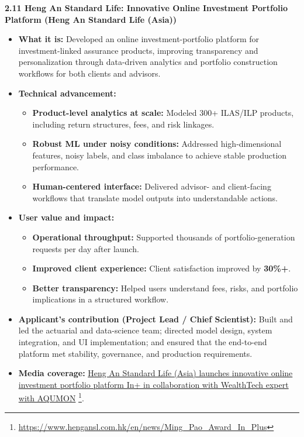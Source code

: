 \documentclass[11pt]{article}
\newcommand{\CVSubsection}[1]{\textbf{#1}\par}
\newenvironment{tightitemize}{%
  \begin{itemize}[leftmargin=*,nosep,topsep=2pt]
}{\end{itemize}}
\begin{document}
\vspace{0.8em}

\CVSubsection{2.11 Heng An Standard Life: Innovative Online Investment Portfolio Platform (Heng An Standard Life (Asia))}

\begin{tightitemize}
  \item \textbf{What it is:} Developed an online investment-portfolio platform for investment-linked assurance products, improving transparency and personalization through data-driven analytics and portfolio construction workflows for both clients and advisors.
  \item \textbf{Technical advancement:}
  \begin{tightitemize}
    \item \textbf{Product-level analytics at scale:} Modeled 300+ ILAS/ILP products, including return structures, fees, and risk linkages.
    \item \textbf{Robust ML under noisy conditions:} Addressed high-dimensional features, noisy labels, and class imbalance to achieve stable production performance.
    \item \textbf{Human-centered interface:} Delivered advisor- and client-facing workflows that translate model outputs into understandable actions.
  \end{tightitemize}
  \item \textbf{User value and impact:}
  \begin{tightitemize}
    \item \textbf{Operational throughput:} Supported thousands of portfolio-generation requests per day after launch.
    \item \textbf{Improved client experience:} Client satisfaction improved by \textbf{30\%+}.
    \item \textbf{Better transparency:} Helped users understand fees, risks, and portfolio implications in a structured workflow.
  \end{tightitemize}
  \item \textbf{Applicant’s contribution (Project Lead / Chief Scientist):} Built and led the actuarial and data-science team; directed model design, system integration, and UI implementation; and ensured that the end-to-end platform met stability, governance, and production requirements.
      \item \textbf{Media coverage:}
\href{https://www.hengansl.com.hk/en/news/Ming_Pao_Award_In_Plus}{Heng An Standard Life (Asia) launches innovative online investment portfolio platform In+ in collaboration with WealthTech expert with AQUMON}
\footnote{\url{https://www.hengansl.com.hk/en/news/Ming_Pao_Award_In_Plus}}.
\end{tightitemize}
\end{document}
